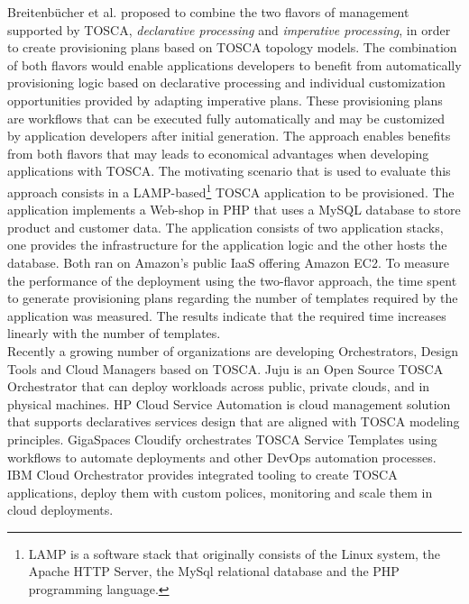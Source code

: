 Breitenb\"{u}cher et al. \cite{breitenbucher2014combining} proposed to combine the two flavors of management
supported by TOSCA, \textit{declarative processing} and \textit{imperative processing}, in order to create
provisioning plans based on TOSCA topology models. The combination of both flavors would enable applications
developers to benefit from automatically provisioning logic based on declarative processing and individual
customization opportunities provided by adapting imperative plans. These provisioning plans are workflows that
can be executed fully automatically and may be customized by application developers after initial generation.
The approach enables benefits from both flavors that may leads to economical advantages when developing applications
with TOSCA. The motivating scenario that is used to evaluate this approach consists in a LAMP-based\footnote{LAMP
is a software stack that originally consists of the Linux system, the Apache HTTP Server, the MySql relational
database and the PHP programming language.} TOSCA application to be provisioned. The application implements
a Web-shop in PHP that uses a MySQL database to store product and customer data. The application consists
of two application stacks, one provides the infrastructure for the application logic and the other hosts
the database. Both ran on Amazon's public IaaS offering Amazon EC2. To measure the performance of the
deployment using the two-flavor approach, the time spent to generate provisioning plans regarding the
number of templates required by the application was measured. The results indicate that the required time
increases linearly with the number of templates.\\

Recently a growing number of organizations are developing Orchestrators, Design Tools and Cloud Managers
based on TOSCA. Juju is an Open Source TOSCA Orchestrator that can deploy workloads across public, private clouds,
and in physical machines. HP Cloud Service Automation is cloud management solution that supports declaratives
services design that are aligned with TOSCA modeling principles. GigaSpaces Cloudify orchestrates TOSCA Service
Templates using workflows to automate deployments and other DevOps automation processes. IBM Cloud Orchestrator
provides integrated tooling to create TOSCA applications, deploy them with custom polices, monitoring and scale
them in cloud deployments.\\
